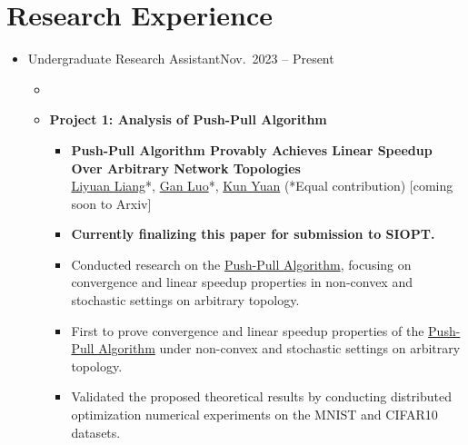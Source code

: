 \section{Research Experience}
\begin{itemize}
    \item {}
          {Undergraduate Research Assistant}{Nov.\ 2023 -- Present}
          \begin{itemize}
              \item {}
              
              \item \textbf{Project 1: Analysis of Push-Pull Algorithm}
              \begin{itemize}
              \item \textbf{Push-Pull Algorithm Provably Achieves Linear
Speedup Over Arbitrary Network Topologies}\\
\href{https://lavaei.ieor.berkeley.edu/Group.html}{Liyuan Liang}*, \underline{Gan Luo}*,  \href{https://kunyuan827.github.io}{Kun Yuan} (*Equal contribution) [coming soon to Arxiv]
                  \item {\textbf{Currently finalizing this paper for submission to SIOPT.}}
                  \item {Conducted research on the \href{https://arxiv.org/pdf/1810.06653v4}{Push-Pull Algorithm}, focusing on convergence and linear speedup properties in non-convex and stochastic settings on arbitrary topology.}
                  \item First to prove convergence and linear speedup properties of the \href{https://arxiv.org/pdf/1810.06653v4}{Push-Pull Algorithm} under non-convex and stochastic settings  on arbitrary topology.
                  \item Validated the proposed theoretical results by conducting distributed optimization numerical experiments on the MNIST and CIFAR10 datasets.
              \end{itemize}
              

\end{itemize}
\end{itemize}
